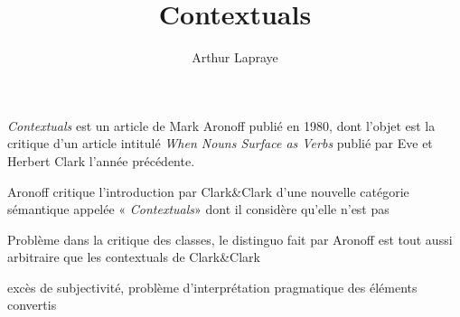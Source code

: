 \documentclass[a4paper,12pt]{article}
\author{Arthur Lapraye}
\title{Contextuals}
\begin{document}
 
 \maketitle
 
 \textit{Contextuals} est un article de Mark Aronoff publié en 1980, dont l'objet est la critique d'un article intitulé 
 \textit{When Nouns Surface as Verbs} publié par Eve et Herbert Clark l'année précédente. 
 
 Aronoff critique l'introduction par Clark\&Clark d'une nouvelle catégorie sémantique appelée « \textit{Contextuals}» 
 dont il considère qu'elle n'est pas
 
 
 Problème dans la critique des classes, le distinguo fait par Aronoff est tout aussi arbitraire que les contextuals de Clark\&Clark 
 
 excès de subjectivité, problème d'interprétation pragmatique des éléments convertis
 
 
  
\end{document}
